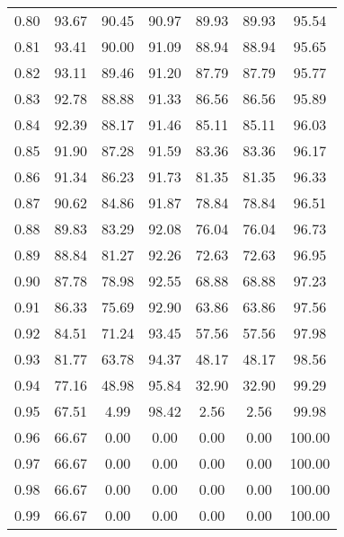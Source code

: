 \begin{tabular}{|c|c|c|c|c|c|c|}
      0.80 &     93.67 &     90.45 &      90.97 &   89.93 &      89.93 &         95.54 \\
      0.81 &     93.41 &     90.00 &      91.09 &   88.94 &      88.94 &         95.65 \\
      0.82 &     93.11 &     89.46 &      91.20 &   87.79 &      87.79 &         95.77 \\
      0.83 &     92.78 &     88.88 &      91.33 &   86.56 &      86.56 &         95.89 \\
      0.84 &     92.39 &     88.17 &      91.46 &   85.11 &      85.11 &         96.03 \\
      0.85 &     91.90 &     87.28 &      91.59 &   83.36 &      83.36 &         96.17 \\
      0.86 &     91.34 &     86.23 &      91.73 &   81.35 &      81.35 &         96.33 \\
      0.87 &     90.62 &     84.86 &      91.87 &   78.84 &      78.84 &         96.51 \\
      0.88 &     89.83 &     83.29 &      92.08 &   76.04 &      76.04 &         96.73 \\
      0.89 &     88.84 &     81.27 &      92.26 &   72.63 &      72.63 &         96.95 \\
      0.90 &     87.78 &     78.98 &      92.55 &   68.88 &      68.88 &         97.23 \\
      0.91 &     86.33 &     75.69 &      92.90 &   63.86 &      63.86 &         97.56 \\
      0.92 &     84.51 &     71.24 &      93.45 &   57.56 &      57.56 &         97.98 \\
      0.93 &     81.77 &     63.78 &      94.37 &   48.17 &      48.17 &         98.56 \\
      0.94 &     77.16 &     48.98 &      95.84 &   32.90 &      32.90 &         99.29 \\
      0.95 &     67.51 &      4.99 &      98.42 &    2.56 &       2.56 &         99.98 \\
      0.96 &     66.67 &      0.00 &       0.00 &    0.00 &       0.00 &        100.00 \\
      0.97 &     66.67 &      0.00 &       0.00 &    0.00 &       0.00 &        100.00 \\
      0.98 &     66.67 &      0.00 &       0.00 &    0.00 &       0.00 &        100.00 \\
      0.99 &     66.67 &      0.00 &       0.00 &    0.00 &       0.00 &        100.00 \\
\bottomrule
\end{tabular}
